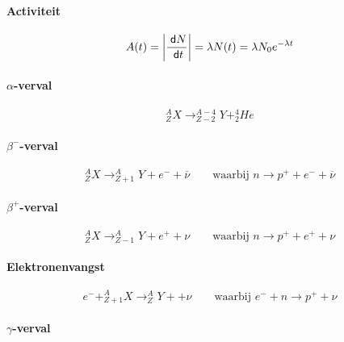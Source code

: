 \paragraph{Activiteit}
\[
  A(t) = \left| \frac{\;\textsf{d}N}{\;\textsf{d}t} \right| = \lambda N(t) = \lambda N_0 e^{-\lambda t}
\]

\paragraph{$\alpha$-verval}
\[
  ^A_ZX  \longrightarrow ^{A-4}_{Z-2}Y + ^4_2He
\]

\paragraph{$\beta^-$-verval}
\[
  ^A_ZX \longrightarrow ^{A}_{Z+1}Y + e^- + \overline{\nu}
  \qquad
  \mbox{waarbij }
  n \longrightarrow p^+ + e^- + \overline{\nu}
\]


\paragraph{$\beta^+$-verval}
\[
  ^A_ZX \longrightarrow ^{A}_{Z-1}Y + e^+ + \nu
  \qquad
  \mbox{waarbij }
  n \longrightarrow p^+ + e^+ + \nu
\]

\paragraph{Elektronenvangst}
\[
  e^- + ^A_{Z+1}X \longrightarrow ^{A}_{Z}Y + + \nu
  \qquad
  \mbox{waarbij }
  e^- + n \longrightarrow p^+ + \nu
\]

\paragraph{$\gamma$-verval}
